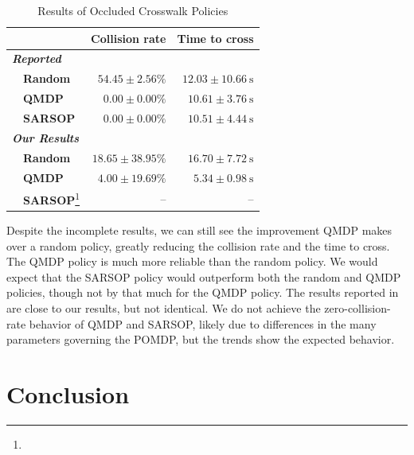 \documentclass[conference]{IEEEtran}
\begin{document}
\begin{table}[tbhp]
    \caption{Results of Occluded Crosswalk Policies}
    \begin{center}
        \begin{tabular}{lrr}
            \hline \hline
            & \textbf{Collision rate} \hspace{3pt} & \textbf{Time to cross} \hspace{1pt} \\
            \hline
            \textit{\textbf{Reported}} & & \\
            ~~\textbf{Random} & $54.45 \pm 2.56\%$ & $12.03 \pm 10.66 ~\si{\second}$ \\
            ~~\textbf{QMDP}   & $0.00 \pm 0.00\%$  & $10.61 \pm 3.76 ~\si{\second}$ \\
            ~~\textbf{SARSOP} & $0.00 \pm 0.00\%$ & $10.51 \pm 4.44 ~\si{\second}$ \\
            \hline
            \textit{\textbf{Our Results}} & & \\
            ~~\textbf{Random} & $18.65 \pm 38.95\%$ & $16.70 \pm 7.72 ~\si{\second}$ \\
            ~~\textbf{QMDP}   & $4.00 \pm 19.69\%$  & $5.34 \pm 0.98 ~\si{\second}$ \\
            ~~\textbf{SARSOP}\footnote{} & -- & -- \\
            \hline \hline
        \end{tabular}
        \label{tab:results}
    \end{center}
\end{table}

Despite the incomplete results, we can still see the improvement QMDP makes over a random policy, greatly reducing the collision rate and the time to cross. The QMDP policy is much more reliable than the random policy. We would expect that the SARSOP policy would outperform both the random and QMDP policies, though not by that much for the QMDP policy. The results reported in \cite{Bouton2018ScalableDriving} are close to our results, but not identical. We do not achieve the zero-collision-rate behavior of QMDP and SARSOP, likely due to differences in the many parameters governing the POMDP, but the trends show the expected behavior.


\section{Conclusion}
\label{sec:conclusion}
\end{document}
